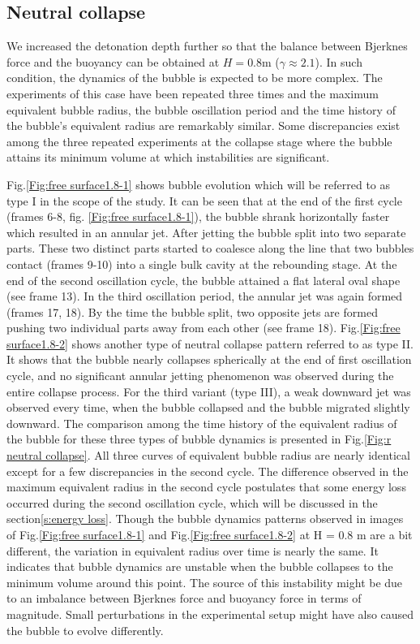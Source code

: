 \documentclass[%
 aip,
 amsmath,amssymb,
 reprint,%
]{revtex4-1}
\begin{document}
{\subsection{Neutral collapse}
We increased the detonation depth further so that the balance between Bjerknes force and the buoyancy can be obtained at $H = 0.8$m ($\gamma\approx 2.1$). In such condition, the dynamics of the bubble is expected to be more complex. The experiments of this case have been repeated three times and the maximum equivalent bubble radius, the bubble oscillation period and the time history of the bubble’s equivalent radius are remarkably similar. Some discrepancies exist among the three repeated experiments at the collapse stage where the bubble attains its minimum volume at which instabilities are significant.

Fig.\ref{Fig:free surface1.8-1} shows bubble evolution which will be referred to as type I in the scope of the study. It can be seen that at the end of the first cycle (frames 6-8, fig. \ref{Fig:free surface1.8-1}), the  bubble shrank horizontally faster which resulted in an annular jet. After jetting the bubble split into two separate parts. These two distinct parts started to coalesce along the line that two bubbles contact (frames 9-10) into a single bulk cavity at the rebounding stage. At the end of the second oscillation cycle, the bubble attained a flat lateral oval shape (see frame 13). In the third oscillation period, the annular jet was again formed (frames 17, 18). By the time the bubble split, two opposite jets are formed pushing two individual parts away from each other (see frame 18). Fig.\ref{Fig:free surface1.8-2} shows another type of neutral collapse pattern referred to as type II. It shows that the bubble nearly collapses spherically at the end of first oscillation cycle, and no significant annular jetting phenomenon was observed during the entire collapse process. For the third variant (type III), a weak downward jet was observed every time, when the bubble collapsed and the bubble migrated slightly downward. The comparison among the time history of the equivalent radius of the bubble for these three types of bubble dynamics is presented in Fig.\ref{Fig:r neutral collapse}. All three curves of equivalent bubble radius are nearly identical except for a few discrepancies in the second cycle. The difference observed in the maximum equivalent radius in the second cycle postulates that some energy loss occurred during the second oscillation cycle, which will be discussed in the section\ref{s:energy loss}. Though the bubble dynamics patterns observed in images of Fig.\ref{Fig:free surface1.8-1} and Fig.\ref{Fig:free surface1.8-2} at H = 0.8 m are a bit different, the variation in equivalent radius over time is nearly the same. It indicates that bubble dynamics are unstable when the bubble collapses to the minimum volume around this point. The source of this instability might be due to an imbalance between Bjerknes force and buoyancy force in terms of magnitude. Small perturbations in the experimental setup might have also caused the bubble to evolve differently.

}
\end{document}
